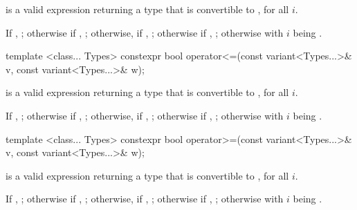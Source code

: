 \begin{itemdescr}
\pnum
\requires
{} is a valid expression returning a type that is
convertible to , for all $i$.

\pnum
\returns
If , ;
otherwise if , ;
otherwise, if , ;
otherwise if , ;
otherwise  with $i$ being .
\end{itemdescr}

%
\begin{itemdecl}
template <class... Types>
  constexpr bool operator<=(const variant<Types...>& v, const variant<Types...>& w);
\end{itemdecl}

\begin{itemdescr}
\pnum
\requires
{} is a valid expression returning a type that is
convertible to , for all $i$.

\pnum
\returns
If , ;
otherwise if , ;
otherwise, if , ;
otherwise if , ;
otherwise  with $i$ being .
\end{itemdescr}

%
\begin{itemdecl}
template <class... Types>
  constexpr bool operator>=(const variant<Types...>& v, const variant<Types...>& w);
\end{itemdecl}

\begin{itemdescr}
\pnum
\requires
{} is a valid expression returning a type that is
convertible to , for all $i$.

\pnum
\returns
If , ;
otherwise if , ;
otherwise, if , ;
otherwise if , ;
otherwise  with $i$ being .
\end{itemdescr}

